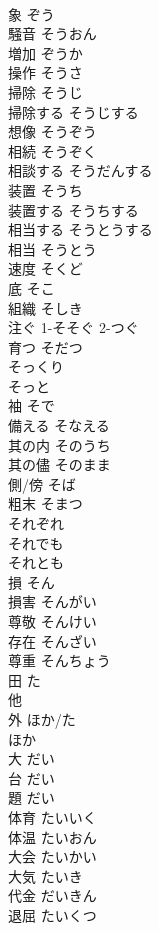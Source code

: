 \documentclass[8pt]{extreport}
\begin{document}
\begin{CJK}{UTF8}{min}
\\	象	ぞう	
\\	騒音	そうおん	
\\	増加	ぞうか	
\\	操作	そうさ	
\\	掃除	そうじ	
\\	掃除する	そうじする	
\\	想像	そうぞう	
\\	相続	そうぞく	
\\	相談する	そうだんする	
\\	装置	そうち	
\\	装置する	そうちする	
\\	相当する	そうとうする	
\\	相当	そうとう	
\\	速度	そくど	
\\	底	そこ	
\\	組織	そしき	
\\	注ぐ	1-そそぐ 2-つぐ	
\\	育つ	そだつ	
\\	そっくり		
\\	そっと		
\\	袖	そで	
\\	備える	そなえる	
\\	其の内	そのうち	
\\	其の儘	そのまま	
\\	側/傍	そば	
\\	粗末	そまつ	
\\	それぞれ		
\\	それでも		
\\	それとも		
\\	損	そん	
\\	損害	そんがい	
\\	尊敬	そんけい	
\\	存在	そんざい	
\\	尊重	そんちょう	
\\	田	た	
\\	他 
\\	外	ほか/た 
\\	ほか	
\\	大	だい	
\\	台	だい	
\\	題	だい	
\\	体育	たいいく	
\\	体温	たいおん	
\\	大会	たいかい	
\\	大気	たいき	
\\	代金	だいきん	
\\	退屈	たいくつ	

\end{CJK}
\end{document}
